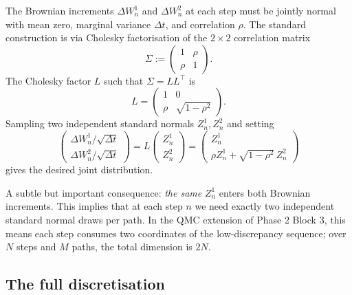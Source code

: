 \documentclass[11pt]{article}
\theoremstyle{plain}
\theoremstyle{definition}
\theoremstyle{remark}
\begin{document}
The Brownian increments $\Delta W^1_n$ and $\Delta W^2_n$ at each step must be jointly normal with mean zero, marginal variance $\Delta t$, and correlation $\rho$. The standard construction is via Cholesky factorisation of the $2\times 2$ correlation matrix
\[
    \Sigma := \begin{pmatrix} 1 & \rho \\ \rho & 1 \end{pmatrix}.
\]
The Cholesky factor $L$ such that $\Sigma = L L^\top$ is
\[
    L = \begin{pmatrix} 1 & 0 \\ \rho & \sqrt{1 - \rho^2} \end{pmatrix}.
\]
Sampling two independent standard normals $Z^1_n, Z^2_n$ and setting
\begin{equation}
    \begin{pmatrix} \Delta W^1_n / \sqrt{\Delta t} \\ \Delta W^2_n / \sqrt{\Delta t} \end{pmatrix} = L \begin{pmatrix} Z^1_n \\ Z^2_n \end{pmatrix} = \begin{pmatrix} Z^1_n \\ \rho Z^1_n + \sqrt{1 - \rho^2}\, Z^2_n \end{pmatrix}                       \label{eq:cholesky}
\end{equation}
gives the desired joint distribution.

A subtle but important consequence: \emph{the same} $Z^1_n$ enters both Brownian increments. This implies that at each step $n$ we need exactly two independent standard normal draws per path. In the QMC extension of Phase 2 Block 3, this means each step consumes two coordinates of the low-discrepancy sequence; over $N$ steps and $M$ paths, the total dimension is $2N$.

\subsection{The full discretisation}
\end{document}

